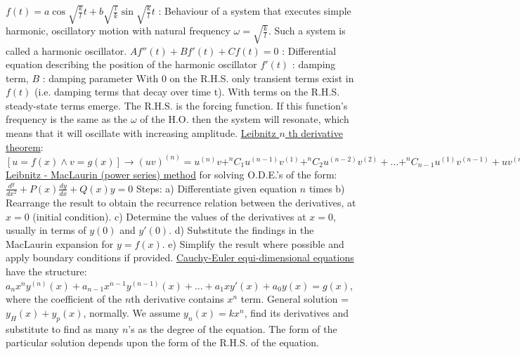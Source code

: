 \documentclass[12pt]{article}
\begin{document}
\begin{flushleft}
	\textbullet \quad $\displaystyle f(t) = a \cos \sqrt{\frac{k}{l}} t + b \sqrt{\frac{l}{k}} \sin \sqrt{\frac{k}{l}} t$  :  Behaviour of a system that executes simple harmonic, oscillatory motion with natural frequency $\omega = \sqrt{\frac{k}{l}}$. Such a system is called a harmonic oscillator. \linebreak 
	\textbullet \quad $Af''(t) + Bf'(t) + Cf(t) = 0 $  :  Differential equation describing the position of the harmonic oscillator \linebreak 
	\textbullet \quad $f'(t)$  :  damping term, $B$  :  damping parameter \linebreak 
	With $0$ on the R.H.S. only transient terms exist in $f(t)$ (i.e. damping terms that decay over time t). With terms on the R.H.S. steady-state terms emerge. \linebreak 
	The R.H.S. is the forcing function. If this function's frequency is the same as the $\omega$ of the H.O. then the system will resonate, which means that it will oscillate with increasing amplitude. \linebreak 
	\uline{Leibnitz $n$ th derivative theorem}: $\displaystyle \left[ u=f(x) \land v = g(x) \right] \rightarrow (uv)^{(n)} = u^{(n)}v + ^nC_1 u^{(n-1)} v^{(1)} + ^nC_2u^{(n-2)} v^{(2)} + \ldots + ^nC_{n-1}u^{(1)}v^{(n-1)} + uv^{(n)} \ , \ u^{(0)} \equiv u$ \linebreak 
	\textbullet \quad \uline{Leibnitz - MacLaurin (power series) method} for solving O.D.E.'s of the form: $\displaystyle \frac{d^y}{dx^2} + P(x) \frac{dy}{dx} + Q(x) y = 0$ \linebreak 
	Steps: \linebreak 
	a) Differentiate given equation $n$ times \linebreak 
	b) Rearrange the result to obtain the recurrence relation between the derivatives, at $x=0$ (initial condition). \linebreak 
	c) Determine the values of the derivatives at $x=0$, usually in terms of $y(0)$ and $y'(0)$. \linebreak 
	d) Substitute the findings in the MacLaurin expansion for $y=f(x)$. \linebreak 
	e) Simplify the result where possible and apply boundary conditions if provided. \linebreak 
	\textbullet \quad \uline{Cauchy-Euler equi-dimensional equations} have the structure: \linebreak 
	$\displaystyle a_nx^n y^{(n)} (x) + a_{n-1}x^{n-1} y^{(n-1)} (x) + \ldots + a_1 xy'(x) + a_0 y(x) = g(x) $, where the coefficient of the $n$th derivative contains $x^n$ term. \linebreak 
	General solution = $y_H(x) + y_p(x)$, normally. We assume $y_n(x) = kx^n$, find its derivatives and substitute to find as many $n$'s as the degree of the equation. The form of the particular solution depends upon the form of the R.H.S. of the equation. \linebreak 
	

\end{flushleft}
\end{document}
